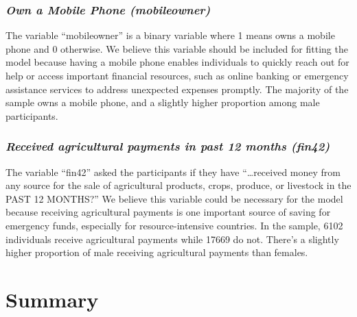 \documentclass[12pt]{article}
\begin{document}
\hypertarget{own-a-mobile-phone-mobileowner}{%
\subsubsection{\texorpdfstring{\emph{Own a Mobile Phone
(mobileowner)}}{Own a Mobile Phone (mobileowner)}}\label{own-a-mobile-phone-mobileowner}}

The variable ``mobileowner'' is a binary variable where 1 means owns a
mobile phone and 0 otherwise. We believe this variable should be
included for fitting the model because having a mobile phone enables
individuals to quickly reach out for help or access important financial
resources, such as online banking or emergency assistance services to
address unexpected expenses promptly. The majority of the sample owns a
mobile phone, and a slightly higher proportion among male participants.

\hypertarget{received-agricultural-payments-in-past-12-months-fin42}{%
\subsubsection{\texorpdfstring{\emph{Received agricultural payments in
past 12 months
(fin42)}}{Received agricultural payments in past 12 months (fin42)}}\label{received-agricultural-payments-in-past-12-months-fin42}}

The variable ``fin42'' asked the participants if they have
``\ldots received money from any source for the sale of agricultural
products, crops, produce, or livestock in the PAST 12 MONTHS?'' We
believe this variable could be necessary for the model because receiving
agricultural payments is one important source of saving for emergency
funds, especially for resource-intensive countries. In the sample, 6102
individuals receive agricultural payments while 17669 do not. There's a
slightly higher proportion of male receiving agricultural payments than
females.

\hypertarget{summary}{%
\section{Summary}\label{summary}}
\end{document}
